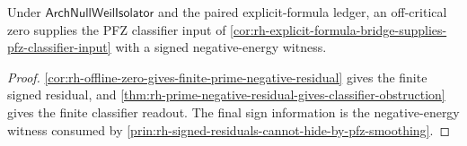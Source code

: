 \begin{corollary}
\label{cor:rh-signed-explicit-formula-bridge-strengthens-scale-faithfulness}
Under $\mathsf{ArchNullWeilIsolator}$ and the paired explicit-formula
ledger, an off-critical zero supplies the PFZ classifier input of
\autoref{cor:rh-explicit-formula-bridge-supplies-pfz-classifier-input}
with a signed negative-energy witness.
\end{corollary}

\begin{proof}
\autoref{cor:rh-offline-zero-gives-finite-prime-negative-residual} gives
the finite signed residual, and
\autoref{thm:rh-prime-negative-residual-gives-classifier-obstruction}
gives the finite classifier readout.  The final sign information is the
negative-energy witness consumed by
\autoref{prin:rh-signed-residuals-cannot-hide-by-pfz-smoothing}.
\end{proof}
